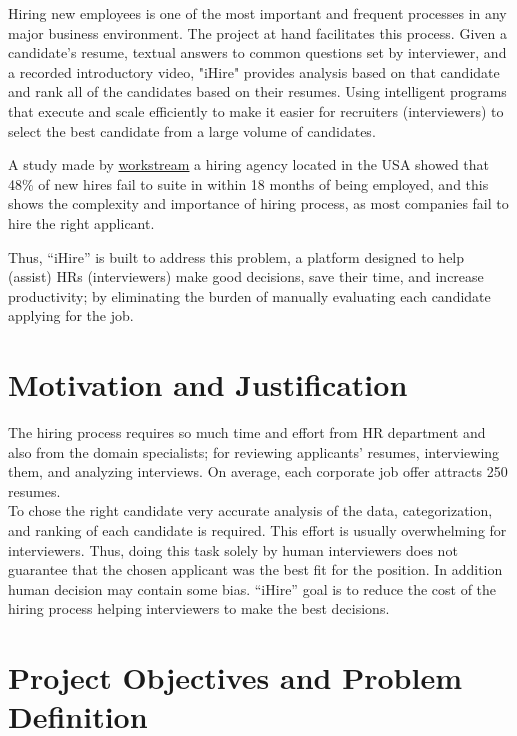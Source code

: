 Hiring new employees is one of the most important and frequent processes in any major business environment. The project at hand facilitates this process. Given a candidate's resume, textual answers to common questions set by interviewer, and a recorded introductory video, "iHire" provides analysis based on that candidate and rank all of the candidates based on their resumes. Using intelligent programs that execute and scale efficiently to make it easier for recruiters (interviewers) to select the best candidate from a large volume of candidates. \newline

A study made by \href{https://www.workstream.us/}{workstream} a hiring agency located in the USA showed that 48\% of new hires fail to suite in within 18 months of being employed, and this shows the complexity and importance of hiring process, as most companies fail to hire the right applicant. \newline

Thus, “iHire” is built to address this problem, a platform designed to help (assist) HRs (interviewers) make good decisions, save their time, and increase productivity; by eliminating the burden of manually evaluating each candidate applying for the job.



\section{Motivation and Justification}
The hiring process requires so much time and effort from HR department and also from the domain specialists; for reviewing applicants’ resumes, interviewing them, and analyzing interviews. On average, each corporate job offer attracts 250 resumes.\\

To chose the right candidate very accurate analysis of the data, categorization, and ranking of each candidate is required. This effort is usually overwhelming for interviewers. Thus, doing this task solely by human interviewers does not guarantee that the chosen applicant was the best fit for the position. In addition human decision may contain some bias. “iHire” goal is to reduce the cost of the hiring process helping interviewers to make the best decisions.

\section{Project Objectives and Problem Definition}
\label{sec:Project Objectives and Problem Definition}

